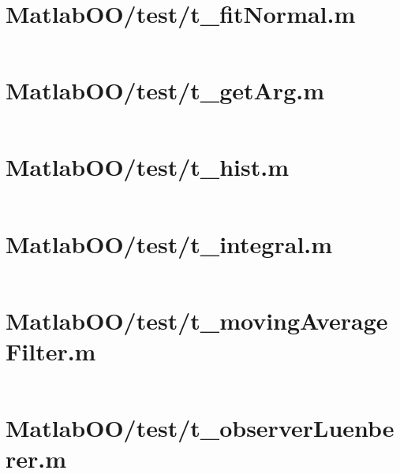 \pagebreak
\section{MatlabOO/test/t\_fitNormal.m}\label{code:MatlabOO/test/t_fitNormal.m}
\inputminted[linenos,fontsize=\scriptsize]{matlab}{/home/dcouture/git/mathyourlife/TSatPy/beta_versions/matlab_object_oriented/test/t_fitNormal.m}

\pagebreak
\section{MatlabOO/test/t\_getArg.m}\label{code:MatlabOO/test/t_getArg.m}
\inputminted[linenos,fontsize=\scriptsize]{matlab}{/home/dcouture/git/mathyourlife/TSatPy/beta_versions/matlab_object_oriented/test/t_getArg.m}

\pagebreak
\section{MatlabOO/test/t\_hist.m}\label{code:MatlabOO/test/t_hist.m}
\inputminted[linenos,fontsize=\scriptsize]{matlab}{/home/dcouture/git/mathyourlife/TSatPy/beta_versions/matlab_object_oriented/test/t_hist.m}

\pagebreak
\section{MatlabOO/test/t\_integral.m}\label{code:MatlabOO/test/t_integral.m}
\inputminted[linenos,fontsize=\scriptsize]{matlab}{/home/dcouture/git/mathyourlife/TSatPy/beta_versions/matlab_object_oriented/test/t_integral.m}

\pagebreak
\section{MatlabOO/test/t\_movingAverageFilter.m}\label{code:MatlabOO/test/t_movingAverageFilter.m}
\inputminted[linenos,fontsize=\scriptsize]{matlab}{/home/dcouture/git/mathyourlife/TSatPy/beta_versions/matlab_object_oriented/test/t_movingAverageFilter.m}

\pagebreak
\section{MatlabOO/test/t\_observerLuenberer.m}\label{code:MatlabOO/test/t_observerLuenberer.m}
\inputminted[linenos,fontsize=\scriptsize]{matlab}{/home/dcouture/git/mathyourlife/TSatPy/beta_versions/matlab_object_oriented/test/t_observerLuenberer.m}

